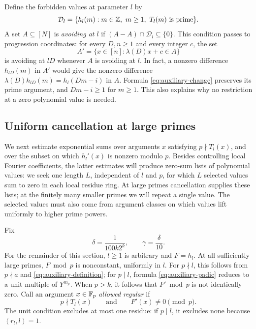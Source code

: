 Define the forbidden values at parameter $l$ by
\begin{equation}\label{eq:forbidden-family}
 \mathcal D_l=
 \{h_l(m):m\in\mathbb Z,\ m\ge1,\ T_l(m)\text{ is prime}\}.
\end{equation}
A set $A\subseteq[N]$ is \emph{avoiding at $l$} if
$(A-A)\cap\mathcal D_l\subseteq\{0\}$.  This condition passes to
progression coordinates: for every $D,n\ge1$ and every integer $c$, the set
\[
 A'=\{x\in[n]:\lambda(D)x+c\in A\}
\]
is avoiding at $lD$ whenever $A$ is avoiding at $l$.  In fact, a nonzero
difference $h_{lD}(m)$ in $A'$ would give the nonzero difference
$\lambda(D)h_{lD}(m)=h_l(Dm-i)$ in $A$.  Formula
\eqref{eq:auxiliary-change} preserves its prime argument, and
$Dm-i\ge1$ for $m\ge1$.  This also explains why no restriction at a zero
polynomial value is needed.

\subsection{Uniform cancellation at large primes}

We next estimate exponential sums over arguments $x$ satisfying
$p\nmid T_l(x)$, and over the subset on which $h_l'(x)$ is nonzero modulo
$p$.  Besides controlling local
Fourier coefficients, the latter estimates will produce zero-sum lists of
polynomial values: we seek one length $L$, independent of $l$ and $p$,
for which $L$ selected values sum to zero in each local residue ring.
At large primes cancellation supplies these lists; at the finitely many
smaller primes we will repeat a single value.  The selected values must
also come from argument classes on which values lift uniformly to higher
prime powers.

Fix
\begin{equation}\label{eq:local-exponents}
 \delta=\frac{1}{100k2^k},\qquad \gamma=\frac{\delta}{10}.
\end{equation}
For the remainder of this section, $l\ge1$ is arbitrary and $F=h_l$.
At all sufficiently large primes, $F\bmod p$ is nonconstant, uniformly
in $l$.  For $p\nmid l$, this follows from $p\nmid a$ and
\eqref{eq:auxiliary-definition}; for $p\mid l$, formula
\eqref{eq:auxiliary-padic} reduces to a unit multiple of $Y^{m_p}$.
When $p>k$, it follows that $F'\bmod p$ is not identically zero.
Call an argument $x\in\mathbb F_p$ \emph{allowed regular} if
\[
 p\nmid T_l(x)\qquad\text{and}\qquad F'(x)\ne0\pmod p.
\]
The unit condition excludes at most one residue: if $p\mid l$, it
excludes none because $(r_l,l)=1$.

